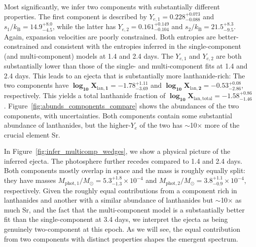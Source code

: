 \documentclass[twocolumn,twocolappendix]{aastex63}
\begin{document}

Most significantly, we infer two components with substantially different properties. The first component is described by $Y_{e,1} = 0.228^{+0.073}_{-0.088}$ and $s_1 / k_{\mathrm{B}} = 14.9^{+8.0}_{-4.5}$, while the latter has $Y_{e,2} = 0.161^{+0.149}_{-0.104}$ and $s_2 / k_{\mathrm{B}} = 21.5^{+8.3}_{-9.5}$. Again, expansion velocities are poorly constrained. Both entropies are better-constrained and consistent with the entropies inferred in the single-component (and multi-component) models at 1.4 and 2.4 days. The $Y_{e,1}$ and $Y_{e,2}$ are both substantially lower than those of the single- and multi-component fits at 1.4 and 2.4 days. This leads to an ejecta that is substantially more lanthanide-rich: The two components have $\mathbf{\log_{10} X_{\mathrm{lan},1} = -1.78^{+1.11}_{-3.69}}$ and $\mathbf{\log_{10} X_{\mathrm{lan},2} = -0.53^{+0.08}_{-2.86}}$, respectively. This yields a total lanthanide fraction of $\mathbf{\log_{10} X_{\mathrm{lan,total}} = -1.58^{+0.86}_{-1.46}}$. Figure~\ref{fig:abunds_components_compare} shows the abundances of the two components, with uncertainties. Both components contain some substantial abundance of lanthanides, but the higher-$Y_e$ of the two has $\sim$10$\times$ more of the crucial element Sr.

In Figure~\ref{fig:infer_multicomp_wedges}, we show a physical picture of the inferred ejecta. The photosphere further recedes compared to 1.4 and 2.4 days. Both components mostly overlap in space and the mass is roughly equally split: they have  masses $M_{\mathrm{phot},1}/M_{\odot} = 5.3^{+1.8}_{-1.3} \times 10^{-4}$ and $M_{\mathrm{phot},2}/M_{\odot} = 3.8^{+1.1}_{-0.9} \times 10^{-4}$, respectively. Given the roughly equal contributions from a component rich in lanthanides and another with a similar abundance of lanthanides but $\sim$10$\times$ as much Sr, and the fact that the multi-component model is a substantially better fit than the single-component at 3.4 days, we interpret the ejecta as being genuinely two-component at this epoch. As we will see, the equal contribution from two components with distinct properties shapes the emergent spectrum. 
\end{document}
